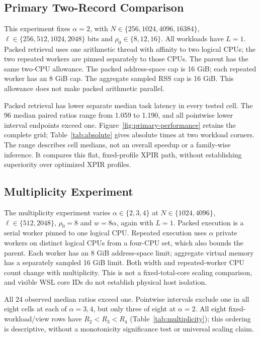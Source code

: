 \subsection{Primary Two-Record Comparison}
\label{sec:primary-performance}
This experiment fixes \(\alpha=2\), with
\(N\in\{256,1024,4096,16384\}\),
\(\ell\in\{256,512,1024,2048\}\) bits and
\(\rho_0\in\{8,12,16\}\). All workloads have \(L=1\).
Packed retrieval uses one arithmetic thread with affinity to two logical
CPUs; the two repeated workers are pinned separately to those CPUs.
The parent has the same two-CPU allowance. The packed address-space cap
is 16 GiB; each repeated worker has an 8 GiB cap. The aggregate sampled
RSS cap is 16 GiB. This allowance does not make packed arithmetic parallel.

Packed retrieval has lower separate median task latency in every tested
cell. The 96 median paired ratios range from 1.059 to 1.190, and all
pointwise lower interval endpoints exceed one. Figure~\ref{fig:primary-performance}
retains the complete grid; Table~\ref{tab:absolute} gives absolute times at
two workload corners. The range describes cell medians, not an overall
speedup or a family-wise inference. It compares this flat, fixed-profile
XPIR path, without establishing superiority over optimized XPIR profiles.



\subsection{Multiplicity Experiment}
\label{sec:multiplicity}
The multiplicity experiment varies \(\alpha\in\{2,3,4\}\) at
\(N\in\{1024,4096\}\), \(\ell\in\{512,2048\}\), \(\rho_0=8\) and
\(w=8\alpha\), again with \(L=1\). Packed execution is a serial worker
pinned to one logical CPU. Repeated execution uses \(\alpha\) private
workers on distinct logical CPUs from a four-CPU set, which also bounds
the parent. Each worker has an 8 GiB address-space limit; aggregate
virtual memory has a separately sampled 16 GiB limit. Both width and
repeated-worker CPU count change with multiplicity. This is not a
fixed-total-core scaling comparison, and visible WSL core IDs do not
establish physical host isolation.

All 24 observed median ratios exceed one. Pointwise intervals exclude
one in all eight cells at each of \(\alpha=3,4\), but only three of eight
at \(\alpha=2\). All eight fixed-workload/view rows have
\(R_2<R_3<R_4\) (Table~\ref{tab:multiplicity}); this ordering is descriptive,
without a monotonicity significance test or universal scaling claim.

